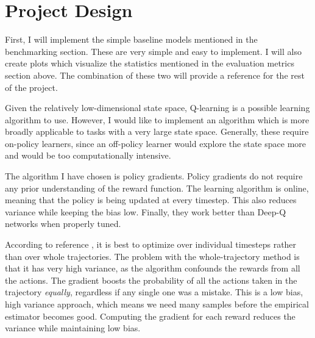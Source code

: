 \documentclass[12pt,a4paper]{article}
\begin{document}
\section*{Project Design}
%
First, I will implement the simple baseline models mentioned in the benchmarking section. These are very simple and easy to implement. I will also create plots which visualize the statistics mentioned in the evaluation metrics section above. The combination of these two will provide a reference for the rest of the project.

Given the relatively low-dimensional state space, Q-learning is a possible learning algorithm to use. However, I would like to implement an algorithm which is more broadly applicable to tasks with a very large state space. Generally, these require on-policy learners, since an off-policy learner would explore the state space more and would be too computationally intensive.

The algorithm I have chosen is policy gradients. Policy gradients do not require any prior understanding of the reward function.\cite{pg_lecture} The learning algorithm is online, meaning that the policy is being updated at every timestep. This also reduces variance while keeping the bias low.\cite{pg_lecture}\cite{ddpg_blog} Finally, they work better than Deep-Q networks when properly tuned.\cite{karp}

According to reference \cite{pg_lecture}, it is best to optimize over individual timesteps rather than over whole trajectories. The problem with the whole-trajectory method is that it has very high variance, as the algorithm confounds the rewards from all the actions. The gradient boosts the probability of all the actions taken in the trajectory \textit{equally}, regardless if any single one was a mistake. This is a low bias, high variance approach, which means we need many samples before the empirical estimator becomes good. Computing the gradient for each reward reduces the variance while maintaining low bias.
\end{document}
